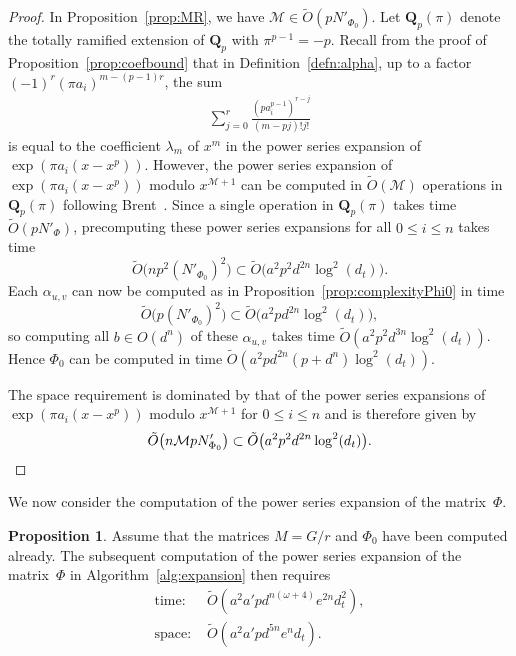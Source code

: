 \documentclass[a4paper,11pt]{article}
\numberwithin{equation}{section}
\newcommand{\QQ}{\mathbf{Q}} %
\providecommand{\BigOh}{O}          %
\providecommand{\SoftOh}{\tilde{O}} %
\theoremstyle{definition}
\newtheorem{prop}[thm]{Proposition}
\begin{document}
\begin{proof}
In Proposition~\ref{prop:MR}, we have $\mathcal{M} \in \SoftOh(pN'_{\Phi_0})$.
Let $\QQ_p(\pi)$ denote the totally ramified extension of $\QQ_p$ with $\pi^{p-1}=-p$.
Recall from the proof of Proposition~\ref{prop:coefbound} that in Definition~\ref{defn:alpha},
up to a factor $(-1)^r (\pi a_i)^{m-(p-1)r}$, the sum
\begin{align*}
\sum_{j=0}^{r} \frac{(p a_i^{p-1})^{r-j}}{(m-pj)!j!}
\end{align*}
is equal to the coefficient $\lambda_{m}$ of $x^m$ in the power series expansion of $\exp(\pi a_i(x-x^p))$. However,
the power series expansion of $\exp(\pi a_i(x-x^p))$ modulo $x^{\mathcal{M}+1}$ can be computed in 
$\SoftOh(\mathcal{M})$ operations in $\QQ_p(\pi)$ following Brent~\citep{Brent1976}. Since
a single operation in $\QQ_p(\pi)$ takes time $\SoftOh(pN'_{\Phi})$, precomputing these
power series expansions for all $0 \leq i \leq n$ takes time 
\[
\SoftOh\bigl(n p^2 (N'_{\Phi_0})^2\bigr) \subset \SoftOh\bigl(a^2 p^2 d^{2n} \log^2(d_t)\bigr).
\]
Each $\alpha_{u,v}$ can now be computed as in Proposition~\ref{prop:complexityPhi0} in time 
\[
\SoftOh\bigl(p(N'_{\Phi_0})^2 \bigr) \subset \SoftOh\bigl(a^2 p d^{2n} \log^2(d_t)\bigr),
\]
so computing all $b \in \BigOh(d^n)$ of these $\alpha_{u,v}$ takes time 
$\SoftOh(a^2 p^2 d^{3n} \log^2(d_t))$. Hence $\Phi_0$
can be computed in time $\SoftOh(a^2 p d^{2n} (p + d^n) \log^2(d_t))$.

The space requirement is dominated by that of the power series expansions of $\exp(\pi a_i(x-x^p))$ modulo $x^{\mathcal{M}+1}$ for $0 \leq i \leq n$
and is therefore given by
\[
\SoftOh\bigl(n \mathcal{M} p N'_{\Phi_0}\bigr) \subset \SoftOh\bigl(a^2 p^2 d^{2n} \log^2(d_t)\bigr). \qedhere
\]
\end{proof}

We now consider the computation of the power series expansion of the 
matrix~$\Phi$.

\begin{prop}
Assume that the matrices $M = G/r$ and $\Phi_0$ have been computed already.
The subsequent computation of the power series expansion of the matrix~$\Phi$ 
in Algorithm~\ref{alg:expansion} then requires
\begin{align*}
\mbox{time: }  &\SoftOh(a^2 a' p d^{n(\omega+4)}e^{2n} d_t^2), \\
\mbox{space: } &\SoftOh(a^2 a' p d^{5n} e^n d_t).
\end{align*}
\end{prop}
\end{document}
